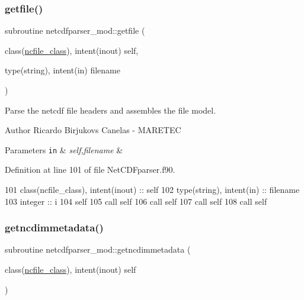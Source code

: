 \subsubsection{\texorpdfstring{getfile()}{getfile()}}
{\footnotesize\ttfamily subroutine netcdfparser\+\_\+mod\+::getfile (\begin{DoxyParamCaption}\item[{class(\mbox{\hyperlink{structnetcdfparser__mod_1_1ncfile__class}{ncfile\+\_\+class}}), intent(inout)}]{self,  }\item[{type(string), intent(in)}]{filename }\end{DoxyParamCaption})\hspace{0.3cm}{\ttfamily [private]}}



Parse the netcdf file headers and assembles the file model. 

\begin{DoxyAuthor}{Author}
Ricardo Birjukovs Canelas -\/ M\+A\+R\+E\+T\+EC 
\end{DoxyAuthor}

\begin{DoxyParams}[1]{Parameters}
\mbox{\tt in}  & {\em self,filename} & \\
\hline
\end{DoxyParams}


Definition at line 101 of file Net\+C\+D\+Fparser.\+f90.


\begin{DoxyCode}
101     \textcolor{keywordtype}{class}(ncfile\_class), \textcolor{keywordtype}{intent(inout)} :: self
102     \textcolor{keywordtype}{type}(string), \textcolor{keywordtype}{intent(in)} :: filename
103     \textcolor{keywordtype}{integer} :: i
104     self%
105     \textcolor{keyword}{call }self%
106     \textcolor{keyword}{call }self%
107     \textcolor{keyword}{call }self%
108     \textcolor{keyword}{call }self%
\end{DoxyCode}
\mbox{\label{namespacenetcdfparser__mod_a6354ee8b3c773cc7a5ad247ad1e34eeb}} 
\subsubsection{\texorpdfstring{getncdimmetadata()}{getncdimmetadata()}}
{\footnotesize\ttfamily subroutine netcdfparser\+\_\+mod\+::getncdimmetadata (\begin{DoxyParamCaption}\item[{class(\mbox{\hyperlink{structnetcdfparser__mod_1_1ncfile__class}{ncfile\+\_\+class}}), intent(inout)}]{self }\end{DoxyParamCaption})\hspace{0.3cm}{\ttfamily [private]}}



